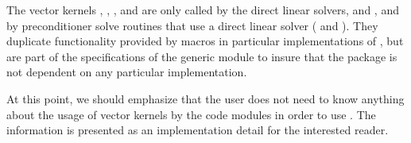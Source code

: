 The vector kernels , , , and
 are only called by the {\cvode} direct linear solvers, 
{\cvdense} and {\cvband}, and by preconditioner solve routines that use a 
direct linear solver ({\cvbandpre}  and {\cvbbdpre}). They duplicate 
functionality provided by macros in particular implementations of {\nvector},
but are part of the specifications of the generic {\nvector} module to insure 
that the {\cvode} package is not dependent on any particular {\nvector} implementation.

At this point, we should emphasize that the {\cvode} user does not need to know 
anything about the usage of vector kernels by the {\cvode} code modules in order 
to use {\cvode}. The information is presented as an implementation detail for the 
interested reader.

